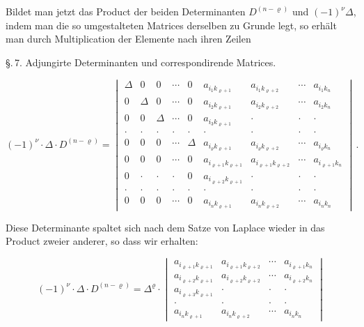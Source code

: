 \documentclass[11pt]{article}
\providecommand{\weberpage}[1]{}
\let\Delta\varDelta
\begin{document}
Bildet man jetzt das Product der beiden Determinanten $D^{(n-\varrho)}$ und $(-1)^\nu\Delta$, indem man die so umgestalteten Matrices derselben zu Grunde legt, so erhält man durch Multiplication der Elemente nach ihren Zeilen


\weberpage{93}
\S.\,7. Adjungirte Determinanten und correspondirende Matrices.

\[
(-1)^{\nu}\cdot \Delta \cdot D^{(n-\varrho)} =
\begin{vmatrix}
\Delta & 0 & 0 & \cdots & 0 & a_{i_1 k_{\varrho+1}} & a_{i_1 k_{\varrho+2}} & \cdots & a_{i_1 k_n} \\
0 & \Delta & 0 & \cdots & 0 & a_{i_2 k_{\varrho+1}} & a_{i_2 k_{\varrho+2}} & \cdots & a_{i_2 k_n} \\
0 & 0 & \Delta & \cdots & 0 & a_{i_3 k_{\varrho+1}} & \cdot & \cdot & \cdot \\
\cdot & \cdot & \cdot & \cdot & \cdot & \cdot & \cdot & \cdot & \cdot \\
0 & 0 & 0 & \cdots & \Delta & a_{i_\varrho k_{\varrho+1}} & a_{i_\varrho k_{\varrho+2}} & \cdots & a_{i_\varrho k_n} \\
0 & 0 & 0 & \cdots & 0 & a_{i_{\varrho+1} k_{\varrho+1}} & a_{i_{\varrho+1} k_{\varrho+2}} & \cdots & a_{i_{\varrho+1} k_n} \\
0 & \cdot & \cdot & \cdot & 0 & a_{i_{\varrho+2} k_{\varrho+1}} & \cdot & \cdot & \cdot \\
\cdot & \cdot & \cdot & \cdot & \cdot & \cdot & \cdot & \cdot & \cdot \\
0 & 0 & 0 & \cdots & 0 & a_{i_n k_{\varrho+1}} & a_{i_n k_{\varrho+2}} & \cdots & a_{i_n k_n}
\end{vmatrix}\, .
\]

Diese Determinante spaltet sich nach dem Satze von Laplace wieder in das Product zweier anderer, so dass wir erhalten:

\begin{equation*}
(-1)^{\nu}\cdot \Delta \cdot D^{(n-\varrho)} = \Delta^{\varrho}\cdot
\begin{vmatrix}
a_{i_{\varrho+1} k_{\varrho+1}} & a_{i_{\varrho+1} k_{\varrho+2}} & \cdots & a_{i_{\varrho+1} k_n} \\
a_{i_{\varrho+2} k_{\varrho+1}} & a_{i_{\varrho+2} k_{\varrho+2}} & \cdots & a_{i_{\varrho+2} k_n} \\
a_{i_{\varrho+3} k_{\varrho+1}} & \cdot & \cdot & \cdot \\
\cdot & \cdot & \cdot & \cdot \\
a_{i_n k_{\varrho+1}} & a_{i_n k_{\varrho+2}} & \cdots & a_{i_n k_n}
\end{vmatrix}
\tag{$A$}
\end{equation*}
\end{document}
